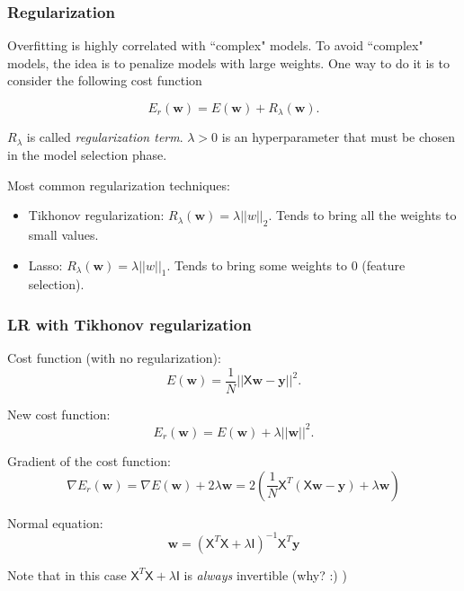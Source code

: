 \documentclass{beamer}
\begin{document}
	\begin{frame}
		\frametitle{Regularization}
		
		Overfitting is highly correlated with ``complex" models. To avoid ``complex" models, the idea is to penalize models with large weights. One way to do it is to consider the following cost function
		
	\vspace{5mm}
	
		\begin{equation*}
			E_{r}(\bm{w}) = E(\bm{w}) + R_{\lambda}(\bm{w}).
		\end{equation*}
		
	\vspace{5mm}
	
	$R_{\lambda}$ is called \textsl{regularization term}.
	$\lambda > 0$ is an hyperparameter that must be chosen in the model selection phase.
	
	Most common regularization techniques:
	\begin{itemize}
		\item Tikhonov regularization: $R_{\lambda}(\bm{w}) = \lambda ||w||_2$. Tends to bring all the weights to small values.
		\item Lasso: $R_{\lambda}(\bm{w}) = \lambda ||w||_1$. Tends to bring some weights to $0$ (feature selection).
	\end{itemize}
	\end{frame}

	\begin{frame}
		\frametitle{LR with Tikhonov regularization}
		Cost function (with no regularization):
		\begin{equation*}
			E(\bm{w}) = \frac{1}{N} ||\mathsf{X} \bm{w} - \bm{y}||^2.
		\end{equation*}
		
		New cost function:
		\begin{equation*}
			E_{r}(\bm{w}) = E(\bm{w}) + \lambda ||\bm{w}||^2.
		\end{equation*}
		
		Gradient of the cost function:
		\begin{equation*}
			\nabla E_r(\bm{w}) = \nabla E(\bm{w}) + 2 \lambda \bm{w} = 2(\frac{1}{N}\mathsf{X}^T(\mathsf{X}\bm{w} - \bm{y}) + \lambda \bm{w})
		\end{equation*}
	
		Normal equation:
		\begin{equation*}
			\bm{w} = (\mathsf{X}^T\mathsf{X} + \lambda \mathsf{I})^{-1}\mathsf{X}^T\bm{y}
		\end{equation*}
	
	Note that in this case $\mathsf{X}^T\mathsf{X} + \lambda \mathsf{I}$ is \textsl{always} invertible (why? :) )
	\end{frame}
\end{document}
